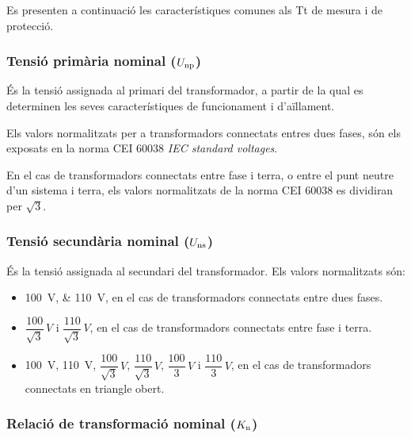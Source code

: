 Es presenten a continuació les característiques comunes als Tt de
mesura i de protecció.

\subsubsection{Tensió primària nominal ($U_\mathrm{np}$)}

És la tensió assignada al primari del transformador, a partir de la
qual es determinen les seves característiques de funcionament i
d'aïllament.

Els valors normalitzats per a transformadors connectats entres dues fases, són els exposats en la norma CEI 60038 \textit{IEC standard voltages}.

En el cas de transformadors connectats entre fase i terra, o entre el punt neutre d'un sistema i terra, els valors normalitzats de la norma CEI 60038 es dividiran per $\sqrt{3}$.


\subsubsection{Tensió secundària nominal ($U_\mathrm{ns}$)}

És la tensió assignada al secundari del transformador.
Els valors normalitzats són:
\begin{itemize}
    \item \qtylist{100;110}{V}, en el cas de transformadors connectats
    entre dues fases.
    \item $\dfrac{100}{\sqrt{3}}\si{\,V}$ i
        $\dfrac{110}{\sqrt{3}}\si{\,V}$, en el cas de transformadors
        connectats entre fase i terra.
    \item \qty{100}{V}, \qty{110}{V}, $\dfrac{100}{\sqrt{3}}\si{\,V}$,
    $\dfrac{110}{\sqrt{3}}\si{\,V}$, $\dfrac{100}{3}\si{\,V}$   i
    $\dfrac{110}{3}\si{\,V}$, en el cas de transformadors
    connectats en triangle obert.
\end{itemize}

\subsubsection{Relació de transformació nominal ($K_\mathrm{n}$)}

